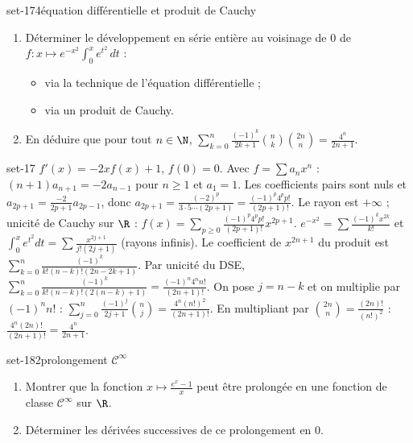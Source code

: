 \begin{exo}{set-17}{4}{équation différentielle et produit de Cauchy}
\begin{enumerate}
\item Déterminer le développement en série entière au voisinage de $0$ de $f:x\mapsto e^{-x^2}\int_0^xe^{t^2}\,dt$ :
\begin{itemize}
\item via la technique de l'équation différentielle ;
\item via un produit de Cauchy.
\end{itemize}
\item En déduire que pour tout $n\in\N$, $\displaystyle\sum_{k=0}^n\frac{(-1)^k}{2k+1}\binom nk\binom{2n}n=\frac{4^n}{2n+1}$.
\end{enumerate}
\end{exo}

\begin{corrige}{set-17}
 $f'(x)=-2xf(x)+1$, $f(0)=0$. Avec $f=\sum a_nx^n$ : $(n+1)a_{n+1}=-2a_{n-1}$ pour $n\geq1$ et $a_1=1$. Les coefficients
pairs sont nuls et $a_{2p+1}=\frac{-2}{2p+1}a_{2p-1}$, donc $a_{2p+1}=\frac{(-2)^p}{3\cdot5\cdots(2p+1)}=\frac{(-1)^p4^pp!}{(2p+1)!}$. Le rayon est $+\infty$ ;
unicité de Cauchy sur $\R$ : $f(x)=\sum_{p\geq0}\frac{(-1)^p4^pp!}{(2p+1)!}x^{2p+1}$.
 $e^{-x^2}=\sum\frac{(-1)^kx^{2k}}{k!}$ et $\int_0^xe^{t^2}dt=\sum\frac{x^{2j+1}}{j!(2j+1)}$ (rayons infinis). Le coefficient de $x^{2n+1}$ du
produit est $\sum_{k=0}^n\frac{(-1)^k}{k!(n-k)!(2n-2k+1)}$.
 Par unicité du DSE, $\sum_{k=0}^n\frac{(-1)^k}{k!(n-k)!(2(n-k)+1)}=\frac{(-1)^n4^nn!}{(2n+1)!}$. On pose $j=n-k$ et on multiplie par $(-1)^nn!$ :
$\sum_{j=0}^n\frac{(-1)^j}{2j+1}\binom nj=\frac{4^n(n!)^2}{(2n+1)!}$. En multipliant par $\binom{2n}n=\frac{(2n)!}{(n!)^2}$ : $\frac{4^n(2n)!}{(2n+1)!}=\frac{4^n}{2n+1}$.
\end{corrige}

\begin{exo}{set-18}{2}{prolongement $\mathcal C^\infty$}
\begin{enumerate}
\item Montrer que la fonction $x\mapsto\frac{e^x-1}x$ peut être prolongée en une fonction de classe $\mathcal C^\infty$ sur $\R$.
\item Déterminer les dérivées successives de ce prolongement en $0$.
\end{enumerate}
\end{exo}

